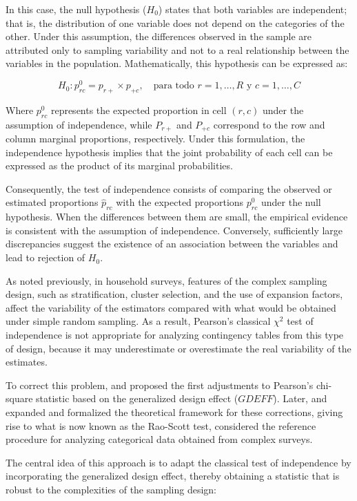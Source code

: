 \documentclass[
  english,
  12pt,
]{book}
\begin{document}
In this case, the null hypothesis (\(H_{0}\)) states that both variables are independent; that is, the distribution of one variable does not depend on the categories of the other. Under this assumption, the differences observed in the sample are attributed only to sampling variability and not to a real relationship between the variables in the population. Mathematically, this hypothesis can be expressed as:

\[
H_0: p_{rc}^0 = p_{r+} \times p_{+c}, \quad \text{para todo } r = 1,\ldots,R \text{ y } c = 1,\ldots,C
\]

Where \(p_{rc}^0\) represents the expected proportion in cell \((r,c)\) under the assumption of independence, while \(P_{r+}\) and \(P_{+c}\) correspond to the row and column marginal proportions, respectively. Under this formulation, the independence hypothesis implies that the joint probability of each cell can be expressed as the product of its marginal probabilities.

Consequently, the test of independence consists of comparing the observed or estimated proportions \(\hat{p}_{rc}\) with the expected proportions \(p_{rc}^0\) under the null hypothesis. When the differences between them are small, the empirical evidence is consistent with the assumption of independence. Conversely, sufficiently large discrepancies suggest the existence of an association between the variables and lead to rejection of \(H_0\).

As noted previously, in household surveys, features of the complex sampling design, such as stratification, cluster selection, and the use of expansion factors, affect the variability of the estimators compared with what would be obtained under simple random sampling. As a result, Pearson's classical \(\chi^2\) test of independence is not appropriate for analyzing contingency tables from this type of design, because it may underestimate or overestimate the real variability of the estimates.

To correct this problem, \citet{fay1979contingency} and \citet{fellegi1980approximate} proposed the first adjustments to Pearson's chi-square statistic based on the generalized design effect (\(GDEFF\)). Later, \citet{rao1984chisquare} and \citet{thomas1987chisquare} expanded and formalized the theoretical framework for these corrections, giving rise to what is now known as the Rao-Scott test, considered the reference procedure for analyzing categorical data obtained from complex surveys.

The central idea of this approach is to adapt the classical test of independence by incorporating the generalized design effect, thereby obtaining a statistic that is robust to the complexities of the sampling design:
\end{document}
